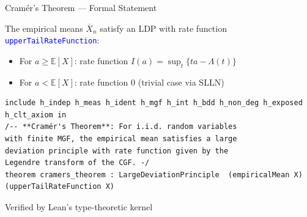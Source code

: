 \documentclass[aspectratio=169]{beamer}
\newcommand{\E}{\mathbb{E}}
\newcommand{\leancode}[1]{\textcolor{blue}{\nolinkurl{#1}}}
\begin{document}

\begin{frame}[fragile]{Cram\'er's Theorem --- Formal Statement}
  \begin{theorem}
    The empirical means $\overline{X}_n$ satisfy an LDP with rate function
    \leancode{upperTailRateFunction}:
    \begin{itemize}
      \item For $a \ge \E[X]$: rate function $I(a) = \sup_t\{ta - \Lambda(t)\}$
      \item For $a < \E[X]$: rate function $0$ (trivial case via SLLN)
    \end{itemize}
  \end{theorem}
  \vspace{0.2cm}
\begin{lstlisting}[basicstyle=\ttfamily\scriptsize]
include h_indep h_meas h_ident h_mgf h_int h_bdd h_non_deg h_exposed h_clt_axiom in
/-- **Cramér's Theorem**: For i.i.d. random variables
with finite MGF, the empirical mean satisfies a large
deviation principle with rate function given by the
Legendre transform of the CGF. -/
theorem cramers_theorem : LargeDeviationPrinciple  (empiricalMean X) (upperTailRateFunction X)
\end{lstlisting}
  \begin{center}
    \small Verified by Lean's type-theoretic kernel
  \end{center}
\end{frame}

\end{document}
